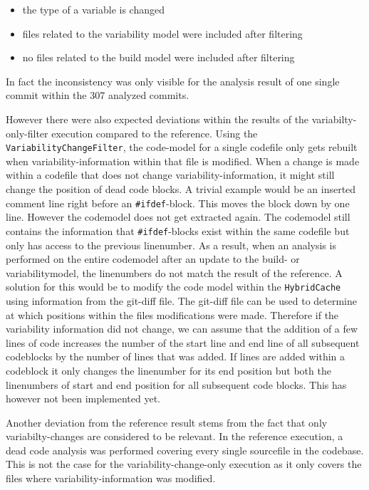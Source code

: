 \documentclass[a4paper]{article}
\begin{document}
\begin{itemize}
	\item the type of a variable is changed
	\item files related to the variability model were included after filtering
	\item no files related to the build model were included after filtering 
\end{itemize}   

In fact the inconsistency was only visible for the analysis result of one single commit within the 307 analyzed commits.

However there were also expected deviations within the results of the variabilty-only-filter execution compared to the reference. Using the \texttt{VariabilityChangeFilter}, the code-model for a single codefile only gets rebuilt when variability-information within that file is modified. When a change is made within a codefile that does not change variability-information, it might still change the position of dead code blocks. A trivial example would be an inserted comment line right before an \texttt{\#ifdef}-block. This moves the block down by one line. However the codemodel does not get extracted again. The codemodel still contains the information that \texttt{\#ifdef}-blocks exist within the same codefile but only has access to the previous linenumber. As a result, when an analysis is performed on the entire codemodel after an update to the build- or variabilitymodel, the linenumbers do not match the result of the reference. A solution for this would be to modify the code model within the \texttt{HybridCache} using information from the git-diff file. The git-diff file can be used to determine at which positions within the files modifications were made. Therefore if the variability information did not change, we can assume that the addition of a few lines of code increases the number of the start line and end line of all subsequent codeblocks by the number of lines that was added. If lines are added within a codeblock it only changes the linenumber for its end position but both the linenumbers of start and end position for all subsequent code blocks. This has however not been implemented yet.

Another deviation from the reference result stems from the fact that only variabilty-changes are considered to be relevant. In the reference execution, a dead code analysis was performed covering every single sourcefile in the codebase. This is not the case for the variability-change-only execution as it only covers the files where variability-information was modified.
\end{document}
